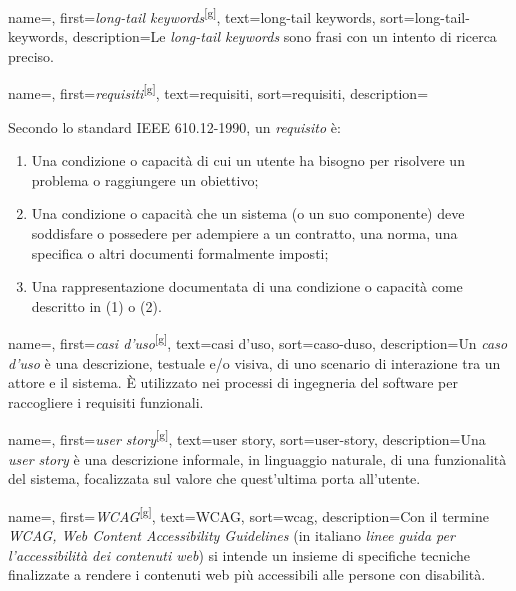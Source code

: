  {
    name=,
    first={\textit{long-tail keywords}\textsuperscript{[g]}},
    text=long-tail keywords,
    sort=long-tail-keywords,
    description={Le \textit{long-tail keywords} sono frasi con un intento di ricerca preciso.}
}

 {
    name=,
    first={\textit{requisiti}\textsuperscript{[g]}},
    text=requisiti,
    sort=requisiti,
    description={Secondo lo standard IEEE 610.12-1990, un \textit{requisito} è:
    \begin{enumerate}
        \item Una condizione o capacità di cui un utente ha bisogno per risolvere un problema o raggiungere un obiettivo;
        \item Una condizione o capacità che un sistema (o un suo componente) deve soddisfare o possedere per adempiere a un contratto, una norma, una specifica o altri documenti formalmente imposti;
        \item Una rappresentazione documentata di una condizione o capacità come descritto in (1) o (2).
    \end{enumerate}
    }
}

 {
    name=,
    first={\textit{casi d'uso}\textsuperscript{[g]}},
    text=casi d'uso,
    sort=caso-duso,
    description={Un \textit{caso d'uso} è una descrizione, testuale e/o visiva, di uno scenario di interazione tra un attore e il sistema. È utilizzato nei processi di ingegneria del software per raccogliere i requisiti funzionali.}
}

 {
    name=,
    first={\textit{user story}\textsuperscript{[g]}},
    text=user story,
    sort=user-story,
    description={Una \textit{user story} è una descrizione informale, in linguaggio naturale, di una funzionalità del sistema, focalizzata sul valore che quest'ultima porta all'utente.}
}

 {
    name=,
    first={\textit{WCAG}\textsuperscript{[g]}},
    text=WCAG,
    sort=wcag,
    description={Con il termine \textit{WCAG, Web Content Accessibility Guidelines} (in italiano \textit{linee guida per l'accessibilità dei contenuti web}) si intende un insieme di specifiche tecniche finalizzate a rendere i contenuti web più accessibili alle persone con disabilità.}
}


